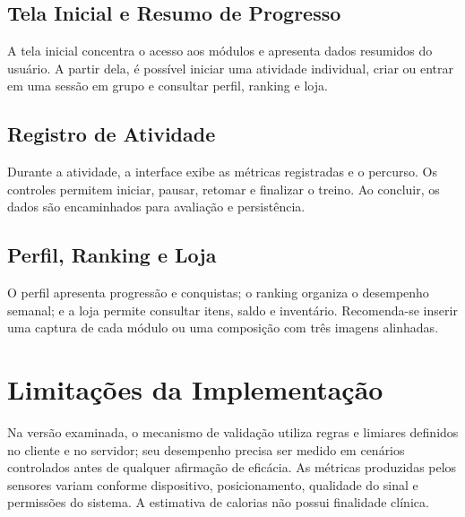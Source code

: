 
\subsection{Tela Inicial e Resumo de Progresso}

A tela inicial concentra o acesso aos módulos e apresenta dados resumidos do usuário. A partir dela, é possível iniciar uma atividade individual, criar ou entrar em uma sessão em grupo e consultar perfil, ranking e loja.


\subsection{Registro de Atividade}

Durante a atividade, a interface exibe as métricas registradas e o percurso. Os controles permitem iniciar, pausar, retomar e finalizar o treino. Ao concluir, os dados são encaminhados para avaliação e persistência.


\subsection{Perfil, Ranking e Loja}

O perfil apresenta progressão e conquistas; o ranking organiza o desempenho semanal; e a loja permite consultar itens, saldo e inventário. Recomenda-se inserir uma captura de cada módulo ou uma composição com três imagens alinhadas.


\section{Limitações da Implementação}
\label{sec:fitworkup_limitacoes}

Na versão examinada, o mecanismo de validação utiliza regras e limiares definidos no cliente e no servidor; seu desempenho precisa ser medido em cenários controlados antes de qualquer afirmação de eficácia. As métricas produzidas pelos sensores variam conforme dispositivo, posicionamento, qualidade do sinal e permissões do sistema. A estimativa de calorias não possui finalidade clínica.

